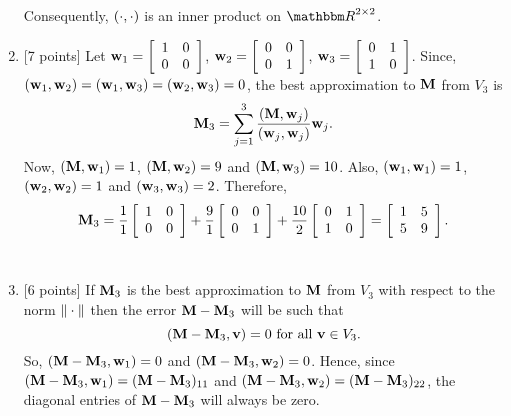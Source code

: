 \begin{solution}
\begin{enumerate}
Consequently, $(\cdot,\cdot)$ is an inner product on $\R^{2\times2}$.
\\
\item {[7 points]} Let ${\bf w}_1=\left[\begin{array}{cc}1 & 0 \\ 0 & 0\end{array}\right]$, ${\bf w}_2=\left[\begin{array}{cc}0 & 0 \\ 0 & 1\end{array}\right]$, ${\bf w}_3=\left[\begin{array}{cc}0 & 1 \\ 1 & 0\end{array}\right]$. Since, $({\bf w}_1,{\bf w}_2)=({\bf w}_1,{\bf w}_3)=({\bf w}_2,{\bf w}_3)=0$, the best approximation to ${\bf M}$ from $V_3$ is
\[
{\bf M}_3=\sum_{j=1}^3{({\bf M},{\bf w}_j) \over ({\bf w}_j,{\bf w}_j)}{\bf w}_j.
\]
Now, $({\bf M},{\bf w}_1)=1$, $({\bf M},{\bf w}_2)=9$ and $({\bf M},{\bf w}_3)=10$. Also, $({\bf w}_1,{\bf w}_1)=1$, $({\bf w}_2,{\bf w}_2)=1$ and $({\bf w}_3,{\bf w}_3)=2$. Therefore,
\[
{\bf M}_3={1 \over 1}\left[\begin{array}{cc}1 & 0 \\ 0 & 0\end{array}\right]+{9 \over 1}\left[\begin{array}{cc}0 & 0 \\ 0 & 1\end{array}\right]+{10 \over 2}\left[\begin{array}{cc}0 & 1 \\ 1 & 0\end{array}\right]=\left[\begin{array}{cc}1 & 5 \\ 5 & 9\end{array}\right].
\]
\\
\item {[6 points]} If ${\bf M}_3$ is the best approximation to ${\bf M}$ from $V_3$ with respect to the norm $\|\cdot\|$ then the error ${\bf M}-{\bf M}_3$ will be such that
\[
({\bf M}-{\bf M}_3,{\bf v})=0\mbox{ for all }{\bf v}\in V_3.
\]
So, $({\bf M}-{\bf M}_3,{\bf w}_1)=0$ and $({\bf M}-{\bf M}_3,{\bf w}_2)=0$. Hence, since $({\bf M}-{\bf M}_3,{\bf w}_1)=({\bf M}-{\bf M}_3)_{11}$ and $({\bf M}-{\bf M}_3,{\bf w}_2)=({\bf M}-{\bf M}_3)_{22}$, the diagonal entries of ${\bf M}-{\bf M}_3$ will always be zero.


\end{enumerate}
\end{solution}
